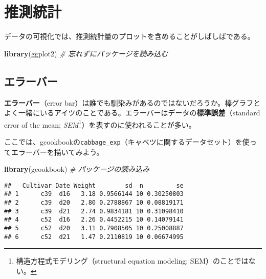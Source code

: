 \documentclass[]{book}
\newenvironment{Shaded}{\begin{snugshade}}{\end{snugshade}}
\newcommand{\KeywordTok}[1]{\textcolor[rgb]{0.13,0.29,0.53}{\textbf{#1}}}
\newcommand{\CommentTok}[1]{\textcolor[rgb]{0.56,0.35,0.01}{\textit{#1}}}
\newcommand{\NormalTok}[1]{#1}
\let\rmarkdownfootnote\footnote%
\def\footnote{\protect\rmarkdownfootnote}
\begin{document}
\chapter{推測統計}\label{statistics}

データの可視化では、推測統計量のプロットを含めることがしばしばである。

\begin{Shaded}
\begin{Highlighting}[]
\KeywordTok{library}\NormalTok{(ggplot2) }\CommentTok{# 忘れずにパッケージを読み込む}
\end{Highlighting}
\end{Shaded}

\section{エラーバー}

\textbf{エラーバー}（error
bar）は誰でも馴染みがあるのではないだろうか。棒グラフとよく一緒にいるアイツのことである。エラーバーはデータの\textbf{標準誤差}（standard
error of the mean; \emph{SEM}\footnote{構造方程式モデリング（structural
  equation modeling; SEM）のことではない。}）を表すのに使われることが多い。

ここでは、gcookbookの\texttt{cabbage\_exp}（キャベツに関するデータセット）を使ってエラーバーを描いてみよう。

\begin{Shaded}
\begin{Highlighting}[]
\KeywordTok{library}\NormalTok{(gcookbook) }\CommentTok{# パッケージの読み込み}
\end{Highlighting}
\end{Shaded}

\begin{Shaded}
\end{Shaded}

\begin{verbatim}
##   Cultivar Date Weight        sd  n         se
## 1      c39  d16   3.18 0.9566144 10 0.30250803
## 2      c39  d20   2.80 0.2788867 10 0.08819171
## 3      c39  d21   2.74 0.9834181 10 0.31098410
## 4      c52  d16   2.26 0.4452215 10 0.14079141
## 5      c52  d20   3.11 0.7908505 10 0.25008887
## 6      c52  d21   1.47 0.2110819 10 0.06674995
\end{verbatim}
\end{document}
